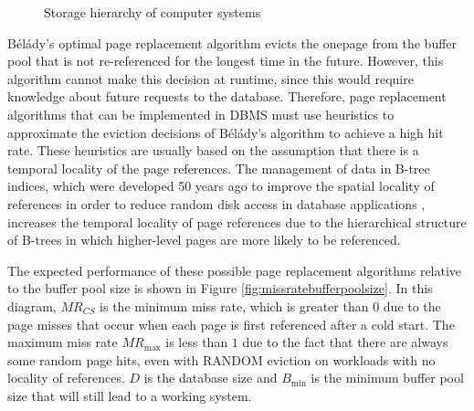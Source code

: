 \begin{@empty}
\begin{figure}[ht!]
\begin{minipage}{\linewidth}
{
            }
        \end{minipage}
        \caption[Storage Hierarchy of Computer Systems]{Storage hierarchy of computer systems}
        \label{fig:storagehierarchy}
        \protect
    \end{figure}
\end{@empty}

    Bélády's optimal page replacement algorithm \cite{Belady:1966} evicts the one\linebreak page from the buffer pool that is not re-referenced for the longest time in the future. However, this algorithm cannot make this decision at runtime, since this would require knowledge about future requests to the database. Therefore, page replacement algorithms that can be implemented in DBMS must use heuristics to approximate the eviction decisions of Bélády's algorithm to achieve a high hit rate. These heuristics are usually based on the assumption that there is a temporal locality of the page references. The management of data in B-tree indices, which were developed 50 years ago to improve the spatial locality of references in order to reduce random disk access in database applications \cite{Bayer:1970}, increases the temporal locality of page references due to the hierarchical structure of B-trees in which higher-level pages are more likely to be referenced.

    The expected performance of these possible page replacement algorithms relative to the buffer pool size is shown in Figure \ref{fig:missratebufferpoolsize}. In this diagram, $MR_{CS}$ is the minimum miss rate, which is greater than $0$ due to the page misses that occur when each page is first referenced after a cold start. The maximum miss rate $MR_{\text{max}}$ is less than $1$ due to the fact that there are always some random page hits, even with RANDOM eviction on workloads with no locality of references. $D$ is the database size and $B_{\text{min}}$ is the minimum buffer pool size that will still lead to a working system.

